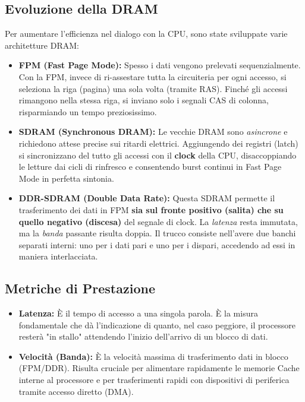 \documentclass[12pt, a4paper]{article}
\begin{document}
\subsection{Evoluzione della DRAM}
Per aumentare l'efficienza nel dialogo con la CPU, sono state sviluppate varie architetture DRAM:
\begin{itemize}
    \item \textbf{FPM (Fast Page Mode):} Spesso i dati vengono prelevati sequenzialmente. Con la FPM, invece di ri-assestare tutta la circuiteria per ogni accesso, si seleziona la riga (pagina) una sola volta (tramite RAS). Finché gli accessi rimangono nella stessa riga, si inviano solo i segnali CAS di colonna, risparmiando un tempo preziosissimo.
    \item \textbf{SDRAM (Synchronous DRAM):} Le vecchie DRAM sono \textit{asincrone} e richiedono attese precise sui ritardi elettrici. Aggiungendo dei registri (latch) si sincronizzano del tutto gli accessi con il \textbf{clock} della CPU, disaccoppiando le letture dai cicli di rinfresco e consentendo burst continui in Fast Page Mode in perfetta sintonia.
    \item \textbf{DDR-SDRAM (Double Data Rate):} Questa SDRAM permette il trasferimento dei dati in FPM \textbf{sia sul fronte positivo (salita) che su quello negativo (discesa)} del segnale di clock. La \textit{latenza} resta immutata, ma la \textit{banda} passante risulta doppia. Il trucco consiste nell'avere due banchi separati interni: uno per i dati pari e uno per i dispari, accedendo ad essi in maniera interlacciata.
\end{itemize}

\subsection{Metriche di Prestazione}
\begin{itemize}
    \item \textbf{Latenza:} È il tempo di accesso a una singola parola. È la misura fondamentale che dà l'indicazione di quanto, nel caso peggiore, il processore resterà "in stallo" attendendo l'inizio dell'arrivo di un blocco di dati.
    \item \textbf{Velocità (Banda):} È la velocità massima di trasferimento dati in blocco (FPM/DDR). Risulta cruciale per alimentare rapidamente le memorie Cache interne al processore e per trasferimenti rapidi con dispositivi di periferica tramite accesso diretto (DMA).
\end{itemize}
\end{document}
